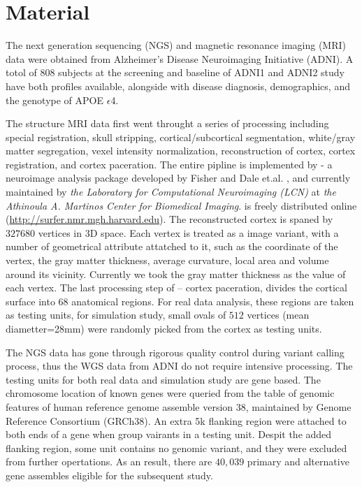 \section{Material}
The next generation sequencing (NGS) and magnetic resonance imaging (MRI) data were obtained from Alzheimer’s Disease Neuroimaging Initiative (ADNI). A totol of 808 subjects at the screening and baseline of ADNI1 and ADNI2 study have both profiles available, alongside with disease diagnosis, demographics, and the genotype of APOE $\epsilon$4. 

The structure MRI data first went throught a series of processing including special registration, skull stripping, cortical/subcortical segmentation, white/gray matter segregation, vexel intensity normalization, reconstruction of cortex, cortex registration, and cortex paceration. The entire pipline is implemented by \FS - a neuroimage analysis package developed by Fisher and Dale et.al. \cite{FS:Intro}, and currently maintained by \textit{the Laboratory for Computational Neuroimaging (LCN)}  at \textit {the Athinoula A. Martinos Center for Biomedical Imaging}. \FS is freely distributed online (\url{http://surfer.nmr.mgh.harvard.edu}). The reconstructed cortex is spaned by $327680$ vertices in 3D space. Each vertex is treated as a image variant, with a number of geometrical attribute attatched to it, such as the coordinate of the vertex, the gray matter thickness, average curvature, local area and volume around its vicinity. Currently we took the gray matter thickness as the value of each vertex. The last processing step of \FS -- cortex paceration, divides the cortical surface into 68 anatomical regions. For real data analysis, these regions are taken as testing units, for simulation study, small ovals of $512$ vertices (mean diametter=28mm) were randomly picked from the cortex as testing units.

The NGS data has gone through rigorous quality control during variant calling process, thus the WGS data from ADNI do not require intensive processing. The testing units for both real data and simulation study are gene based. The chromosome location of known genes were queried from the table of genomic features of human reference genome assemble version 38, maintained by Genome Reference Consortium (GRCh38). An extra 5k flanking region were attached to both ends of a gene when group vairants in a testing unit. Despit the added flanking region, some unit contains no genomic variant, and they were excluded from further opertations. As an result, there are $40,039$ primary and alternative gene assembles eligible for the subsequent study.